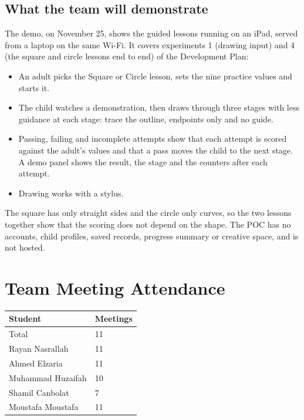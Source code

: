 \documentclass{article}
\begin{document}
\subsection*{What the team will demonstrate}

The demo, on November 25, shows the guided lessons running on an iPad, served
from a laptop on the same Wi-Fi. It covers experiments 1 (drawing input) and 4
(the square and circle lessons end to end) of the Development Plan:

\begin{itemize}
    \item An adult picks the Square or Circle lesson, sets the nine practice
    values and starts it.
    \item The child watches a demonstration, then draws through three stages
    with less guidance at each stage: trace the outline, endpoints only and
    no guide.
    \item Passing, failing and incomplete attempts show that each attempt is
    scored against the adult's values and that a pass moves the child to the
    next stage. A demo panel shows the result, the stage and the counters
    after each attempt.
    \item Drawing works with a stylus.
\end{itemize}

The square has only straight sides and the circle only curves, so the two
lessons together show that the scoring does not depend on the shape. The POC
has no accounts, child profiles, saved records, progress summary or creative
space, and is not hosted.

\section{Team Meeting Attendance}

\begin{table}[H]
\centering
\begin{tabular}{ll}
\toprule
\textbf{Student} & \textbf{Meetings}\\
\midrule
Total & 11\\
Rayan Nasrallah & 11\\
Ahmed Elzaria & 11\\
Muhammad Huzaifah & 10\\
Shamil Canbolat & 7\\
Moustafa Moustafa & 11\\
\bottomrule
\end{tabular}
\end{table}
\end{document}
